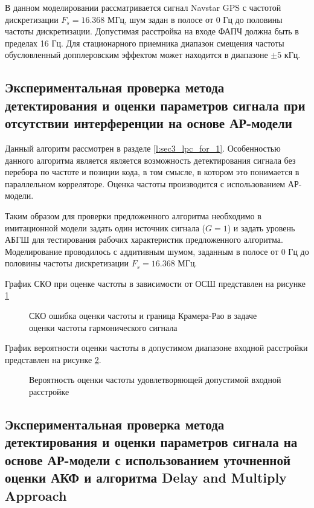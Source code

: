 В данном моделировании рассматривается сигнал Navstar GPS с частотой дискретизации ${F_s=16.368}$ МГц, шум задан в полосе от 0 Гц
до половины частоты дискретизации. Допустимая расстройка на входе ФАПЧ должна быть в пределах 16 Гц. 
Для стационарного приемника диапазон смещения частоты обусловленный допплеровским эффектом \cite{tsui} может находится в диапазоне ${\pm 5}$ кГц.

\subsection{Экспериментальная проверка метода детектирования и оценки параметров сигнала при отсутствии интерференции на основе АР-модели}

Данный алгоритм рассмотрен в разделе \ref{l:sec3_lpc_for_1}. Особенностью данного алгоритма является является возможность детектирования сигнала
без перебора по частоте и позиции кода, в том смысле, в котором это понимается в параллельном корреляторе. Оценка частоты производится с
использованием АР-модели.

Таким образом для проверки предложенного алгоритма необходимо в имитационной модели задать один источник сигнала (${G=1}$) и задать уровень АБГШ для
тестирования рабочих характеристик предложенного алгоритма. Моделирование проводилось с аддитивным шумом, заданным в полосе от 0 Гц до
половины частоты дискретизации ${F_s=16.368}$ МГц.

График СКО при оценке частоты в зависимости от ОСШ представлен на рисунке \ref{pic:crlb_vs_1sat_algo}
\begin{figure}[H]
\center{}
	\caption{СКО ошибка оценки частоты и граница Крамера-Рао в задаче оценки частоты гармонического сигнала}
	\label{pic:crlb_vs_1sat_algo}
\end{figure}

График вероятности оценки частоты в допустимом диапазоне входной расстройки представлен на рисунке
\ref{pic:lpc_for_1_probability}. 
\begin{figure}[H]
\center{}
	\caption{Вероятность оценки частоты удовлетворяющей допустимой входной расстройке}
	\label{pic:lpc_for_1_probability}
\end{figure}

\subsection{Экспериментальная проверка метода детектирования и оценки параметров сигнала на основе АР-модели с использованием уточненной оценки АКФ
	и алгоритма Delay and Multiply Approach}


